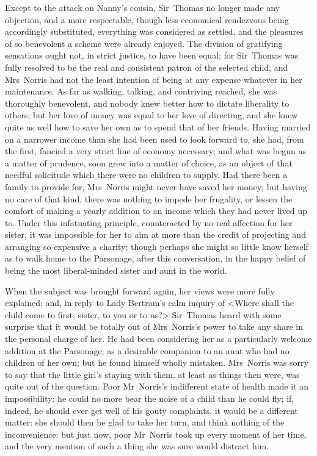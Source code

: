 Except to the attack on Nanny's cousin, Sir~Thomas no longer made any objection, and a more respectable, though less economical rendezvous being accordingly substituted, everything was considered as settled, and the pleasures of so benevolent a scheme were already enjoyed. The division of gratifying sensations ought not, in strict justice, to have been equal; for Sir~Thomas was fully resolved to be the real and consistent patron of the selected child, and Mrs~Norris had not the least intention of being at any expense whatever in her maintenance. As far as walking, talking, and contriving reached, she was thoroughly benevolent, and nobody knew better how to dictate liberality to others; but her love of money was equal to her love of directing, and she knew quite as well how to save her own as to spend that of her friends. Having married on a narrower income than she had been used to look forward to, she had, from the first, fancied a very strict line of economy necessary; and what was begun as a matter of prudence, soon grew into a matter of choice, as an object of that needful solicitude which there were no children to supply. Had there been a family to provide for, Mrs~Norris might never have saved her money; but having no care of that kind, there was nothing to impede her frugality, or lessen the comfort of making a yearly addition to an income which they had never lived up to. Under this infatuating principle, counteracted by no real affection for her sister, it was impossible for her to aim at more than the credit of projecting and arranging so expensive a charity; though perhaps she might so little know herself as to walk home to the Parsonage, after this conversation, in the happy belief of being the most liberal-minded sister and aunt in the world.

When the subject was brought forward again, her views were more fully explained; and, in reply to Lady Bertram's calm inquiry of <Where shall the child come to first, sister, to you or to us?> Sir~Thomas heard with some surprise that it would be totally out of Mrs~Norris's power to take any share in the personal charge of her. He had been considering her as a particularly welcome addition at the Parsonage, as a desirable companion to an aunt who had no children of her own; but he found himself wholly mistaken. Mrs~Norris was sorry to say that the little girl's staying with them, at least as things then were, was quite out of the question. Poor Mr~Norris's indifferent state of health made it an impossibility: he could no more bear the noise of a child than he could fly; if, indeed, he should ever get well of his gouty complaints, it would be a different matter: she should then be glad to take her turn, and think nothing of the inconvenience; but just now, poor Mr~Norris took up every moment of her time, and the very mention of such a thing she was sure would distract him.

